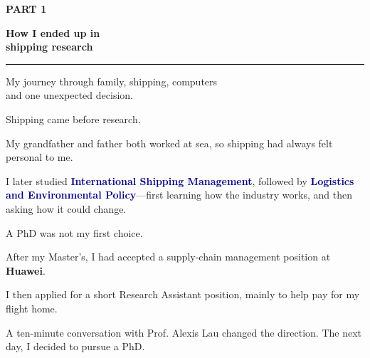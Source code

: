 \documentclass[aspectratio=169,11pt]{beamer}
\newcommand{\eyebrow}[1]{%
  {\color{Orange}\fontsize{9}{11}\selectfont\bfseries\MakeUppercase{#1}\par}
}
\begin{document}
\begin{frame}[plain]
  \vfill
  \eyebrow{Part 1}

  \vspace{0.55cm}
  {\color{Navy}\fontsize{30}{34}\selectfont\bfseries
    How I ended up in\\
    shipping research
  \par}

  \vspace{0.46cm}
  {\color{Orange}\rule{2.1cm}{1.4pt}\par}

  \vspace{0.42cm}
  {\color{Muted}\fontsize{14}{19}\selectfont
    My journey through family, shipping, computers\\
    and one unexpected decision.
  \par}
  \vfill
\end{frame}

\begin{frame}{Shipping came before research.}
  \vspace{0.35cm}
  {\color{Navy}\fontsize{15}{21}\selectfont
    My grandfather and father both worked at sea, so shipping had always
    felt personal to me.
  \par}

  \vspace{0.58cm}
  {\color{Muted}\fontsize{14}{20}\selectfont
    I later studied \textcolor{Navy}{\bfseries International Shipping
    Management}, followed by \textcolor{Navy}{\bfseries Logistics and
    Environmental Policy}—first learning how the industry works, and then
    asking how it could change.
  \par}
\end{frame}

\begin{frame}{A PhD was not my first choice.}
  \vspace{0.25cm}
  {\color{Navy}\fontsize{14.5}{20}\selectfont
    After my Master’s, I had accepted a supply-chain management position
    at \textbf{Huawei}.
  \par}

  \vspace{0.42cm}
  {\color{Muted}\fontsize{14}{20}\selectfont
    I then applied for a short Research Assistant position, mainly to help
    pay for my flight home.
  \par}

  \vspace{0.42cm}
  {\color{Navy}\fontsize{14.5}{20}\selectfont
    A ten-minute conversation with Prof. Alexis Lau changed the direction.
    The next day, I decided to pursue a PhD.
  \par}
\end{frame}
\end{document}
